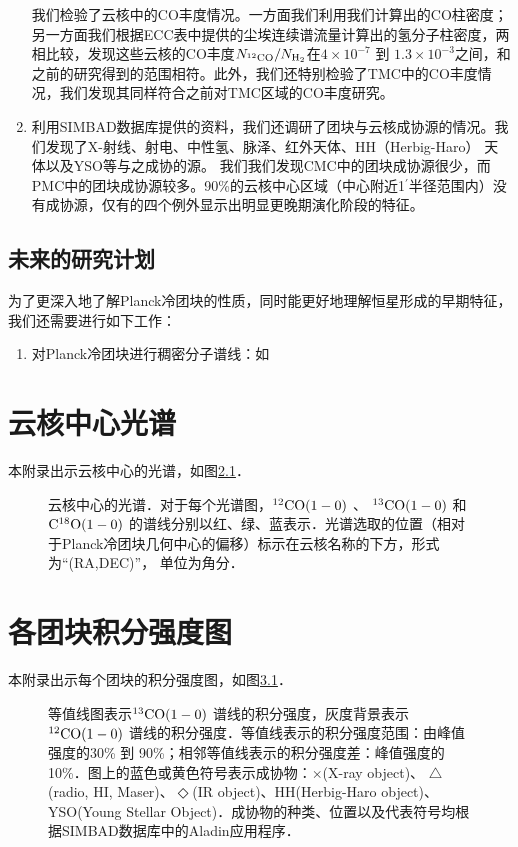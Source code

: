 \documentclass[UTF8, nocolorlinks]{pkuthss}
\newcommand{\coaa}{$\rm^{12}CO(1-0)$ }
\newcommand{\cobb}{$\rm^{13}CO(1-0)$ }
\newcommand{\cocc}{$\rm C^{18}O(1-0)$ }
\newcommand{\arcmin}{$^{\prime}$}
\begin{document}
\begin{enumerate}
	    	我们检验了云核中的CO丰度情况。一方面我们利用我们计算出的CO柱密度；另一方面我们根据ECC表中提供的尘埃连续谱流量计算出的氢分子柱密度，两相比较，发现这些云核的CO丰度$N_{\rm^{12}CO}/N_{\rm H_{2}}$在$4\times 10^{-7}$ 到 $1.3\times 10^{-3 }$之间，和之前的研究得到的范围相符\supercite{1988ApJ...334..771V}。此外，我们还特别检验了TMC中的CO丰度情况，我们发现其同样符合之前对TMC区域的CO丰度研究\supercite{1982ApJ...262..590F}。
	    \item
	    	利用SIMBAD数据库提供的资料，我们还调研了团块与云核成协源的情况。我们发现了X-射线、射电、中性氢、脉泽、红外天体、HH（Herbig-Haro） 天体以及YSO等与之成协的源。 我们我们发现CMC中的团块成协源很少，而PMC中的团块成协源较多。90\%的云核中心区域（中心附近1\arcmin 半径范围内）没有成协源，仅有的四个例外显示出明显更晚期演化阶段的特征。
    	\end{enumerate}
	\section{未来的研究计划}
		为了更深入地了解Planck冷团块的性质，同时能更好地理解恒星形成的早期特征，我们还需要进行如下工作：
		\begin{enumerate}
	     \item 
	     	对Planck冷团块进行稠密分子谱线：如
    	\end{enumerate}
\appendix 

\printbibliography[heading = bibintoc]

\chapter{云核中心光谱}\label{App.Spectra}
	本附录出示云核中心的光谱，如图\ref{Fig.Spectra}．

	\begin{figure}[h]
		\caption{云核中心的光谱．对于每个光谱图，\coaa 、 \cobb 和 \cocc   的谱线分别以红、绿、蓝表示．光谱选取的位置（相对于Planck冷团块几何中心的偏移）标示在云核名称的下方，形式为“(RA,DEC)”， 单位为角分．\label{Fig.Spectra}}
	\end{figure}
		\vspace{-18mm}

\chapter{各团块积分强度图}\label{App.Map}
	
	本附录出示每个团块的积分强度图，如图\ref{Fig.Map}．

	\begin{figure}[h]
		\caption{等值线图表示\cobb 谱线的积分强度，灰度背景表示\coaa 谱线的积分强度．等值线表示的积分强度范围：由峰值强度的30\% 到 90\%；相邻等值线表示的积分强度差：峰值强度的10\%．图上的蓝色或黄色符号表示成协物：$\times$(X-ray object)、 $\triangle$(radio, {HI}, Maser)、$\Diamond$(IR object)、HH(Herbig-Haro object)、YSO(Young Stellar Object)．成协物的种类、位置以及代表符号均根据SIMBAD数据库中的Aladin应用程序．\label{Fig.Map}}
	\end{figure}
		\vspace{-18mm}

\backmatter




\end{document}
